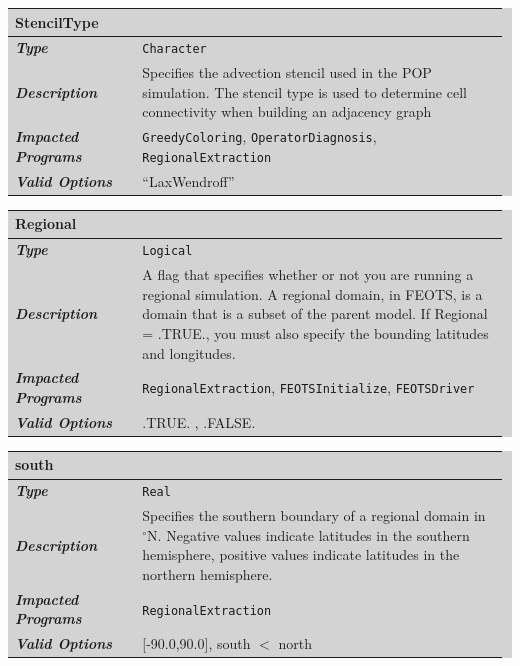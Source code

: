 \documentclass{softwaremanual}
\begin{document}

\noindent\begingroup\setlength{\fboxsep}{0pt}
\colorbox{lightgray}{
\begin{tabular}{p{0.25\linewidth} p{0.725\linewidth}}
\toprule
\textbf{StencilType} & \\
\midrule
\textbf{\textit{Type}} & \texttt{Character} \\
\midrule
\textbf{\textit{Description}} & Specifies the advection stencil used in the POP simulation. The stencil type is used to determine cell connectivity when building an adjacency graph  \\
\midrule
\textbf{\textit{Impacted Programs}} & \texttt{GreedyColoring}, \texttt{OperatorDiagnosis}, \texttt{RegionalExtraction} \\
\midrule
\textbf{\textit{Valid Options}}  & ``LaxWendroff'' \\
\bottomrule
\end{tabular}
}\endgroup


\noindent\begingroup\setlength{\fboxsep}{0pt}
\colorbox{lightgray}{
\begin{tabular}{p{0.25\linewidth} p{0.725\linewidth}}
\toprule
\textbf{Regional} & \\
\midrule
\textbf{\textit{Type}} & \texttt{Logical} \\
\midrule
\textbf{\textit{Description}} & A flag that specifies whether or not you are running a regional simulation. A regional domain, in FEOTS, is a domain that is a subset of the parent model. If Regional = .TRUE., you must also specify the bounding latitudes and longitudes. \\
\midrule
\textbf{\textit{Impacted Programs}} & \texttt{RegionalExtraction}, \texttt{FEOTSInitialize}, \texttt{FEOTSDriver} \\
\midrule
\textbf{\textit{Valid Options}}  & .TRUE. , .FALSE. \\
\bottomrule
\end{tabular}
}\endgroup


\noindent\begingroup\setlength{\fboxsep}{0pt}
\colorbox{lightgray}{
\begin{tabular}{p{0.25\linewidth} p{0.725\linewidth}}
\toprule
\textbf{south} & \\
\midrule
\textbf{\textit{Type}} & \texttt{Real} \\
\midrule
\textbf{\textit{Description}} & Specifies the southern boundary of a regional domain in $^\circ$N. Negative values indicate latitudes in the southern hemisphere, positive values indicate latitudes in the northern hemisphere. \\
\midrule
\textbf{\textit{Impacted Programs}} & \texttt{RegionalExtraction} \\
\midrule
\textbf{\textit{Valid Options}}  & [-90.0,90.0], south $<$ north \\
\bottomrule
\end{tabular}
}\endgroup
\end{document}
